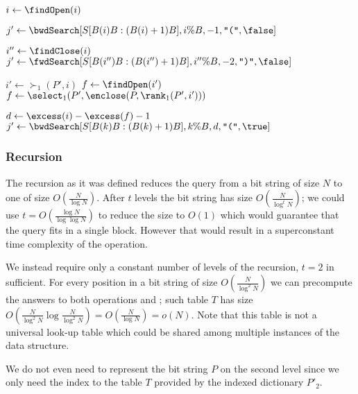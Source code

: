 \begin{algorithmic}
		\State $i \gets \findOpen(i)$
	\EndIf

	\State $j' \gets \bwdSearch[S[B(i)B : (B(i)+1) B], i \% B, -1, \openingParen, \false]$
		\State {} 
	\EndIf
	
	\State $i'' \gets \findClose(i)$
	\State $j' \gets \fwdSearch[S[B(i'')B : (B(i'')+1) B], i'' \% B, -2, \closingParen, \false]$
		\State {} 
	\EndIf
	
	\State

	\State $i' \gets \succ_1(P', i)$
		\State $f \gets \findOpen(i')$
	\Else
		\State $f \gets \select_1(P', \enclose(P, \rank_1(P', i')))$ 
	\EndIf
	
	\State $d \gets \excess(i) - \excess(f) - 1$
	\State $j' \gets \bwdSearch[S[B(k)B: (B(k) + 1)B], k \% B, d, \openingParen, \true]$
	\State {}
\EndFunction
\end{algorithmic}

\subsubsection{Recursion}

The recursion as it was defined reduces the query from a bit string of size $N$ to one of size $O(\frac{N}{\log N})$.
After $t$ levels the bit string has size $O(\frac{N}{\log^t N})$; we could use $t = O(\frac{\log N}{\log\log N})$ to reduce the size to $O(1)$ which would guarantee that the query fits in a single block.
However that would result in a superconstant time complexity of the operation.

We instead require only a constant number of levels of the recursion, $t = 2$ in sufficient.
For every position in a bit string of size $O(\frac{N}{\log^2 N})$ we can precompute the answers to both operations \match{} and \enclose{}; such table $T$ has size $O(\frac{N}{\log^2 N} \log \frac{N}{\log^2 N}) = O(\frac{N}{\log N}) = o(N)$.
Note that this table is not a universal look-up table which could be shared among multiple instances of the data structure.

We do not even need to represent the bit string $P$ on the second level since we only need the index to the table $T$ provided by the indexed dictionary $P'_2$.

